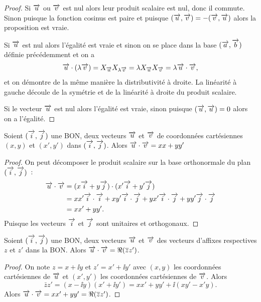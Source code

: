 \begin{proof}
    Si \(\overrightarrow{u}\) ou \(\overrightarrow{v}\) est nul alors leur produit scalaire est nul, donc il 
    commute. Sinon puisque la fonction cosinus est paire et puisque \((\overrightarrow{u} , \overrightarrow{v}) 
    = -(\overrightarrow{v} , \overrightarrow{u})\) alors la proposition est vraie.

    Si \(\overrightarrow{u}\) est nul alors l'égalité est vraie et sinon on se place dans la 
    base \((\overrightarrow{a},\overrightarrow{b})\) définie précédemment et on a 
    \begin{equation}
        \overrightarrow{u} \cdot (\lambda \overrightarrow{v}) = X_{\overrightarrow{u}} X_{\lambda \overrightarrow{v}} = \lambda X_{\overrightarrow{u}} 
        X_{\overrightarrow{v}} = \lambda \overrightarrow{u} \cdot \overrightarrow{v},
    \end{equation}
    et on démontre de la même manière la distributivité à droite. La linéarité à 
    gauche découle de la symétrie et de la linéarité à droite du produit 
    scalaire.

    Si le vecteur \(\overrightarrow{u}\) est nul alors l'égalité est vraie, sinon puisque 
    \((\overrightarrow{u} , \overrightarrow{u}) = 0\) alors on a l'égalité.
\end{proof}

\begin{prop}
    Soient \((\overrightarrow{i} , \overrightarrow{j})\) une BON, deux vecteurs \(\overrightarrow{u}\) et \(\overrightarrow{v}\) de 
    coordonnées cartésiennes \((x , y)\) et \((x',y')\) dans \((\overrightarrow{i} , \overrightarrow{j})\). Alors 
    \(\overrightarrow{u} \cdot \overrightarrow{v} = xx + yy'\)
\end{prop}

\begin{proof}
    On peut décomposer le produit scalaire sur la base orthonormale du plan 
    \((\overrightarrow{i} , \overrightarrow{j})\)~:
    \begin{align}
        \overrightarrow{u} \cdot \overrightarrow{v} &= (x \overrightarrow{i} + y \overrightarrow{j}) \cdot (x' \overrightarrow{i} + y' \overrightarrow{j}) \\
                      &= x x' \overrightarrow{i} \cdot \overrightarrow{i} + xy' \overrightarrow{i} \cdot \overrightarrow{j} + yx' \overrightarrow{i} \cdot 
                      \overrightarrow{j} + yy' \overrightarrow{j} \cdot \overrightarrow{j}\\
                      & = xx' +yy'.
    \end{align}
    Puisque les vecteurs \(\overrightarrow{i}\) et \(\overrightarrow{j}\) sont unitaires et orthogonaux.
\end{proof}

\begin{prop}
    Soient \((\overrightarrow{i} , \overrightarrow{j})\) une BON, deux vecteurs \(\overrightarrow{u}\) et \(\overrightarrow{v}\) des vecteurs 
    d'affixes respectives \(z\) et \(z'\) dans la BON\@. Alors \(\overrightarrow{u} \cdot 
    \overrightarrow{v} = \Re(\overline{z} z')\).
\end{prop}

\begin{proof}
    On note \(z = x + \ii y\) et \(z' = x' + \ii y'\) avec \((x , y)\) les 
    coordonnées cartésiennes de \(\overrightarrow{u}\) et \((x',y')\) les coordonnées 
    cartésiennes de \(\overrightarrow{v}\). Alors
    \begin{equation}
        \bar{z} z' = (x - \ii y)(x' + \ii y') = xx' + yy' + \ii(xy'-x'y).
    \end{equation}
    Alors \(\overrightarrow{u} \cdot \overrightarrow{v} = xx' + yy' = \Re(\overline{z} z')\).
\end{proof}

